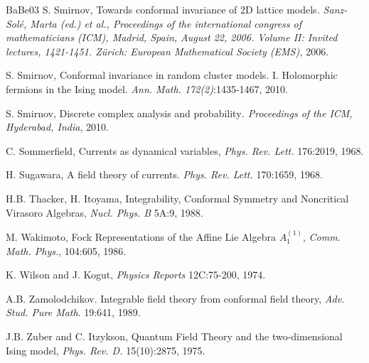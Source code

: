 \documentclass[12pt,oneside,english]{amsart}
\numberwithin{equation}{section}
\numberwithin{figure}{section}
\theoremstyle{plain}
\theoremstyle{plain}
\theoremstyle{plain}
\theoremstyle{plain}
\theoremstyle{remark}
\theoremstyle{definition}
\theoremstyle{plain}
\theoremstyle{plain}
\numberwithin{thm}{section}
\begin{document}
\begin{thebibliography}{BaBe03}
S. Smirnov,\emph{ }Towards conformal invariance
of 2D lattice models\emph{.} \emph{Sanz-Sol\'e, Marta (ed.) et al.,
Proceedings of the international congress of mathematicians (ICM),
Madrid, Spain, August 22, 2006. Volume II: Invited lectures,
1421-1451. Zürich: European Mathematical Society (EMS),} 2006.

S. Smirnov\emph{, }Conformal invariance
in random cluster models. I. Holomorphic fermions in the Ising model.\emph{
Ann. Math. 172(2)}:1435-1467, 2010.

S. Smirnov,\emph{ }Discrete complex analysis
and probability\emph{. Proceedings of the ICM, Hyderabad, India},
2010.

C. Sommerfield, Currents as dynamical
variables, \emph{Phys. Rev. Lett.} 176:2019, 1968.

H. Sugawara, A field theory of currents.
\emph{Phys. Rev. Lett.} 170:1659, 1968.

H.B. Thacker, H. Itoyama, Integrability,
Conformal Symmetry and Noncritical Virasoro Algebras,\emph{ Nucl.
Phys. B} 5A:9, 1988.

M. Wakimoto, Fock Representations of the
Affine Lie Algebra $A_{1}^{\left(1\right)}$, \emph{Comm. Math. Phys.},
104:605, 1986.

K. Wilson and J. Kogut, \emph{Physics
Reports} 12C:75-200, 1974.

A.B. Zamolodchikov. Integrable field
theory from conformal field theory,\emph{ Adv. Stud. Pure Math}. 19:641,
1989.

J.B. Zuber and C. Itzykson, Quantum
Field Theory and the two-dimensional Ising model, \emph{Phys. Rev.
D.} 15(10):2875, 1975. 
\end{thebibliography}
\end{document}
